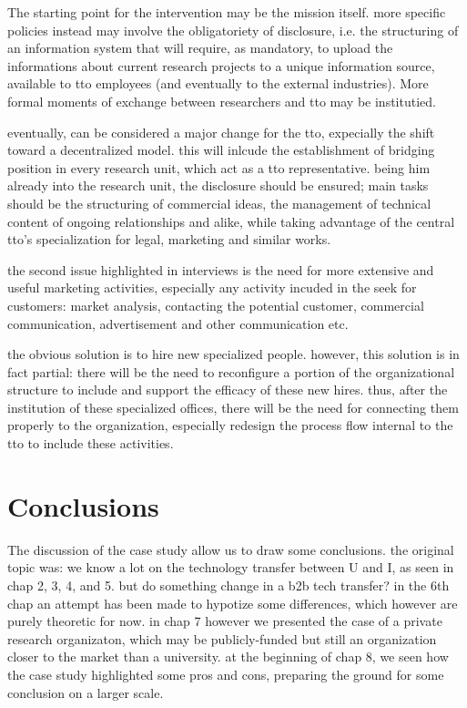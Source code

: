 The starting point for the intervention may be the mission itself. more specific policies instead may involve the obligatoriety of disclosure, i.e. the structuring of an information system that will require, as mandatory, to upload the informations about current research projects to a unique information source, available to tto employees (and eventually to the external industries). More formal moments of exchange between researchers and tto may be institutied.

eventually, can be considered a major change for the tto, expecially the shift toward a decentralized model. this will inlcude the establishment of bridging position in every research unit, which act as a tto representative. being him already into the research unit, the disclosure should be ensured; main tasks should be the structuring of commercial ideas, the management of technical content of ongoing relationships and alike, while taking advantage of the central tto's specialization for legal, marketing and similar works.

the second issue highlighted in interviews is the need for more extensive and useful marketing activities, especially any activity incuded in the seek for customers: market analysis, contacting the potential customer, commercial communication, advertisement and other communication etc. 

the obvious solution is to hire new specialized people. however, this solution is in fact partial: there will be the need to reconfigure a portion of the organizational structure to include and support the efficacy of these new hires. thus, after the institution of these specialized offices, there will be the need for connecting them properly to the organization, especially redesign the process flow internal to the tto to include these activities.

\section{Conclusions}

The discussion of the case study allow us to draw some conclusions. the original topic was: we know a lot on the technology transfer between U and I, as seen in chap 2, 3, 4, and 5. but do something change in a b2b tech transfer? in the 6th chap an attempt has been made to hypotize some differences, which however are purely theoretic for now. in chap 7 however we presented the case of a private research organizaton, which may be publicly-funded but still an organization closer to the market than a university. at the beginning of chap 8, we seen how the case study highlighted some pros and cons, preparing the ground for some conclusion on a larger scale.

